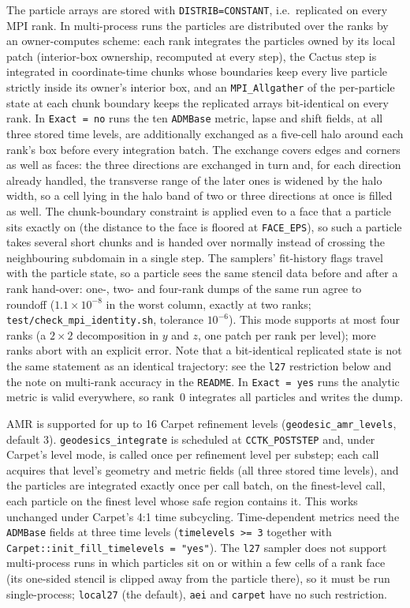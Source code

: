 \documentclass{article}
\begin{document}
The particle arrays are stored with \texttt{DISTRIB=CONSTANT}, i.e.\
replicated on every MPI rank.  In multi-process runs the particles are
distributed over the ranks by an owner-computes scheme: each rank
integrates the particles owned by its local patch (interior-box
ownership, recomputed at every step), the Cactus step is integrated in
coordinate-time chunks whose boundaries keep every live particle
strictly inside its owner's interior box, and an
\texttt{MPI\_Allgather} of the per-particle state at each chunk
boundary keeps the replicated arrays bit-identical on every rank.
In \texttt{Exact = no} runs the ten \texttt{ADMBase} metric, lapse and
shift fields, at all three stored time levels, are additionally
exchanged as a five-cell halo around each rank's box before every
integration batch.  The exchange covers edges and corners as well as
faces: the three directions are exchanged in turn and, for each
direction already handled, the transverse range of the later ones is
widened by the halo width, so a cell lying in the halo band of two or
three directions at once is filled as well.  The chunk-boundary
constraint is applied even to a face that a particle sits exactly on
(the distance to the face is floored at \texttt{FACE\_EPS}), so such a
particle takes several short chunks and is handed over normally instead
of crossing the neighbouring subdomain in a single step.  The
samplers' fit-history flags travel with the particle state, so a
particle sees the same stencil data before and after a rank hand-over:
one-, two- and four-rank dumps of the same run agree to roundoff
($1.1 \times 10^{-8}$ in the worst column, exactly at two ranks;
\texttt{test/check\_mpi\_identity.sh}, tolerance $10^{-6}$).
This mode supports at most four ranks (a $2 \times 2$ decomposition in
$y$ and $z$, one patch per rank per level); more ranks abort with an
explicit error.  Note that a bit-identical replicated state is not the
same statement as an identical trajectory: see the \texttt{l27}
restriction below and the note on multi-rank accuracy in the
\texttt{README}.  In \texttt{Exact = yes} runs the analytic metric is
valid everywhere, so rank~0 integrates all particles and writes the
dump.

AMR is supported for up to 16 Carpet refinement levels
(\texttt{geodesic\_amr\_levels}, default 3).
\texttt{geodesics\_integrate} is scheduled at \texttt{CCTK\_POSTSTEP}
and, under Carpet's level mode, is called once per refinement level per
substep; each call acquires that level's geometry and metric fields
(all three stored time levels), and the particles are integrated
exactly once per call batch, on the finest-level call, each particle on
the finest level whose safe region contains it.  This works unchanged
under Carpet's 4:1 time subcycling.  Time-dependent metrics need the
\texttt{ADMBase} fields at three time levels (\texttt{timelevels >= 3}
together with \texttt{Carpet::init\_fill\_timelevels = "yes"}).  The
\texttt{l27} sampler does not support multi-process runs in which
particles sit on or within a few cells of a rank face (its one-sided
stencil is clipped away from the particle there), so it must be run
single-process; \texttt{local27} (the default), \texttt{aei} and
\texttt{carpet} have no such restriction.
\end{document}

